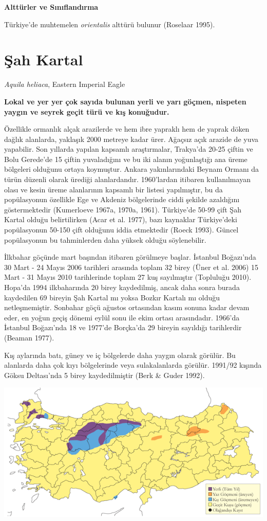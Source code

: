 \documentclass[
  letterpaper,
  DIV=11,
  numbers=noendperiod]{scrreprt}
\begin{document}
\textbf{Alttürler ve Sınıflandırma}

Türkiye'de muhtemelen \emph{orientalis} alttürü bulunur (Roselaar 1995).

\section{Şah Kartal}\label{ux15fah-kartal}

\emph{Aquila heliaca}, Eastern Imperial Eagle

\textbf{Lokal ve yer yer çok sayıda bulunan yerli ve yarı göçmen,
nispeten yaygın ve seyrek geçit türü ve kış konuğudur.}

Özellikle ormanlık alçak arazilerde ve hem ibre yapraklı hem de yaprak
döken dağlık alanlarda, yaklaşık 2000 metreye kadar ürer. Ağaçsız açık
arazide de yuva yapabilir. Son yıllarda yapılan kapsamlı araştırmalar,
Trakya'da 20-25 çiftin ve Bolu Gerede'de 15 çiftin yuvaladığını ve bu
iki alanın yoğunlaştığı ana üreme bölgeleri olduğunu ortaya koymuştur.
Ankara yakınlarındaki Beynam Ormanı da türün düzenli olarak ürediği
alanlardandır. 1960'lardan itibaren kullanılmayan olası ve kesin üreme
alanlarının kapsamlı bir listesi yapılmıştır, bu da popülasyonun
özellikle Ege ve Akdeniz bölgelerinde ciddi şekilde azaldığını
göstermektedir (Kumerloeve 1967a, 1970a, 1961). Türkiye'de 50-99 çift
Şah Kartal olduğu belirtilirken (Acar et al. 1977), bazı kaynaklar
Türkiye'deki popülasyonun 50-150 çift olduğunu iddia etmektedir (Roeck
1993). Güncel popülasyonun bu tahminlerden daha yüksek olduğu
söylenebilir.

İlkbahar göçünde mart başından itibaren görülmeye başlar. İstanbul
Boğazı'nda 30 Mart - 24 Mayıs 2006 tarihleri arasında toplam 32 birey
(Üner et al. 2006) 15 Mart - 31 Mayıs 2010 tarihlerinde toplam 27 kuş
sayılmıştır (Topluluğu 2010). Hopa'da 1994 ilkbaharında 20 birey
kaydedilmiş, ancak daha sonra burada kaydedilen 69 bireyin Şah Kartal mı
yoksa Bozkır Kartalı mı olduğu netleşmemiştir. Sonbahar göçü ağustos
ortasından kasım sonuna kadar devam eder, en yoğun geçiş dönemi eylül
sonu ile ekim ortası arasındadır. 1966'da İstanbul Boğazı'nda 18 ve
1977'de Borçka'da 29 bireyin sayıldığı tarihlerdir (Beaman 1977).

Kış aylarında batı, güney ve iç bölgelerde daha yaygın olarak görülür.
Bu alanlarda daha çok kıyı bölgelerinde veya sulakalanlarda görülür.
1991/92 kışında Göksu Deltası'nda 5 birey kaydedilmiştir (Berk \& Guder
1992).

\includegraphics{images/harita_Page_095.png}
\end{document}
